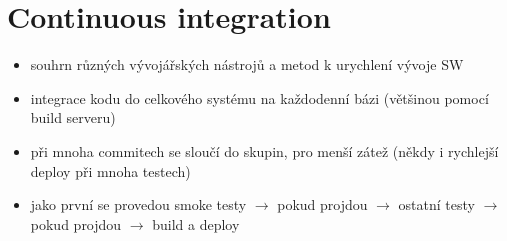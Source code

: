\documentclass{szzclass}
\begin{document}
\section{Continuous integration}
\begin{itemize}
  \item souhrn různých vývojářských nástrojů a metod k urychlení vývoje SW
  \item integrace kodu do celkového systému na každodenní bázi (většinou pomocí build serveru)
  \item při mnoha commitech se sloučí do skupin, pro menší zátež (někdy i rychlejší deploy při mnoha testech)
  \item jako první se provedou smoke testy $\rightarrow$ pokud projdou $\rightarrow$ ostatní testy $\rightarrow$ pokud projdou $\rightarrow$ build a deploy
\end{itemize}
\end{document}
